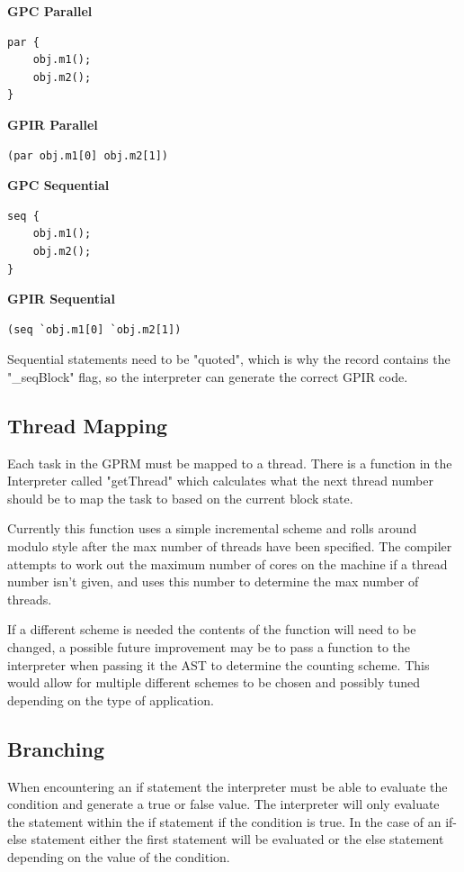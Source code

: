 \begin{minipage}{.48\textwidth}
\center \textbf{GPC Parallel}
\begin{lstlisting}[style=myGPC, frame=single]
par {
    obj.m1();
    obj.m2();
}
\end{lstlisting}

\center \textbf{GPIR Parallel}
\begin{lstlisting}[style=myGPIR, frame=single]
(par obj.m1[0] obj.m2[1])
\end{lstlisting}
\end{minipage}
\hfill
%
%
\begin{minipage}{.48\textwidth}
\center \textbf{GPC Sequential}
\begin{lstlisting}[style=myGPC, frame=single]
seq {
    obj.m1();
    obj.m2();
}
\end{lstlisting}

\center \textbf{GPIR Sequential}
\begin{lstlisting}[style=myGPIR, frame=single]
(seq `obj.m1[0] `obj.m2[1])
\end{lstlisting}
\end{minipage}
 
Sequential statements need to be "quoted", which is why the record contains
the "\_seqBlock" flag, so the interpreter can generate the correct GPIR code.

\subsection{Thread Mapping}
Each task in the GPRM must be mapped to a thread. There is a function
in the Interpreter called "getThread" which calculates what the next thread 
number should be to map the task to based on the current block state.

Currently this function uses a simple incremental scheme and rolls around
modulo style after the max number of threads have been specified. The compiler
attempts to work out the maximum number of cores on the machine if a thread
number isn't given, and uses this number to determine the max number of threads.

If a different scheme is needed the contents of the function will need to be changed,
a possible future improvement may be to pass a function to the interpreter when passing
it the AST to determine the counting scheme. This would allow for multiple different schemes
to be chosen and possibly tuned depending on the type of application.


\subsection{Branching}
When encountering an if statement the interpreter must be able to evaluate the condition and generate a
true or false value. The interpreter will only evaluate the statement within the if statement
if the condition is true. In the case of an if-else statement either the first statement will
be evaluated or the else statement depending on the value of the condition.


